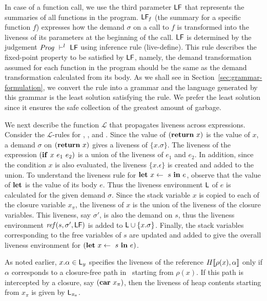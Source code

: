 \documentclass[9pt]{sigplanconf}
\begin{document}
In case of a  function call, we  use the third  parameter $\mathsf{LF}$
that  represents  the  summaries  of all  functions  in  the  program.
$\mathsf{LF}_{\mathit  f}$  (the summary for a  specific
function $f$) expresses  how the demand $\sigma$ on a  call to $f$ is
transformed into  the liveness of  its parameters at the  beginning of
the  call.  $\mathsf{LF}$  is determined  by the  judgement $\mathit{Prog}
\ \vdash^l\   \mathsf{LF}$ using  inference rule  ({\sc live-define}).   This rule
describes  the  fixed-point property  to  be  satisfied by  $\mathsf{LF}$,
namely, the  demand transformation  assumed for  each function  in the
program should  be the  same as  the demand  transformation calculated
from      its      body.       As       we      shall      see      in
Section~\ref{sec:grammar-formulation},  we  convert  the rule  into  a
grammar and  the language generated  by this grammar is  the least
solution satisfying  the rule. We  prefer the least solution  since it
ensures the safe collection of the greatest amount of garbage.

We next  describe the function $\mathcal{L}$  that propagates liveness
across  expressions.   Consider  the $\mathcal{L}$-rules  for  {\LET},
{\SIF}, and {\SRETURN}.  Since the value of $(\mbox{$\mathbf{ return}$}~x)$ is the
value  of  $x$,  a  demand $\sigma$  on  $(\mbox{$\mathbf{ return}$}~x)$  gives  a
liveness   of  $\{x.\sigma\}$.    The  liveness   of  the   expression
$(\mbox{$\mathbf{ if}$}~x~e_1~e_2)$  is  a union  of  the  liveness of  $e_1$  and
$e_2$. In  addition, since  the condition $x$  is also  evaluated, the
liveness $\{x.\epsilon\}$ is created and  added to the union.  
To  understand  the  liveness rule  for  $\mbox{$\mathbf{ let}$}~x  \leftarrow~s~\mbox{$\mathbf{ in}$}~e$,
observe that the value  of $\mbox{$\mathbf{ let}$}$ is the value of  its body $e$.  Thus
the  liveness environment  $\mathsf{L}$ of  $e$ is  calculated for  the given
demand $\sigma$. Since the stack variable $x$ is copied to each of the
closure variable  $x_{\pi}$, the liveness of  $x$ is the union  of the
liveness of the  closure variables.  This liveness,  say $\sigma'$, is
also  the  demand  on  $s$, thus the  liveness  environment
$\mathit{ref}(s,   \sigma',   \mathsf{LF})$   is  added   to   $\mathsf{L}   \cup
\{x.\sigma\}$. Finally, the stack variables corresponding to the free
variables of $s$ are updated and added 
  to  give the  overall liveness environment  for $(\mbox{$\mathbf{ let}$}~x
\leftarrow~s~\mbox{$\mathbf{ in}$}~e)$.

As noted earlier,  $x.\alpha \in \mathsf{L}_y$ specifies the  liveness of the
reference $H\llbracket\rho(x), \alpha\rrbracket$  only if $\alpha$
corresponds to a closure-free path  in \heap\ starting from $\rho(x)$.
If this path is intercepted by a closure, say $(\mbox{$\mathbf{car}$}~{x_{\pi}})$, then
the liveness of heap contents starting from $\mathit{x_{\pi}}$
is given by $\mathsf{L}_\mathit{x_{\pi}}$.
\end{document}
